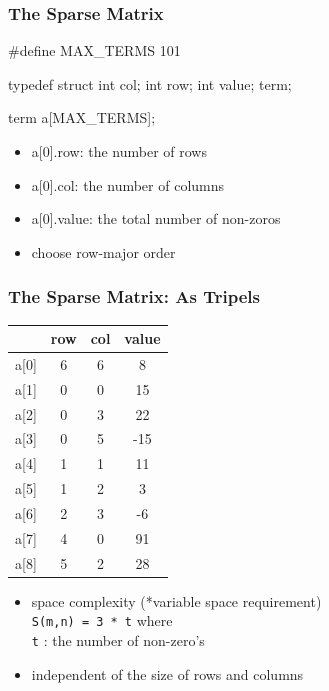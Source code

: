 \documentclass[newPxFont,sthlmFooter,nooffset]{beamer}
\begin{document}
\begin{frame}[t, fragile]
  \frametitle{The Sparse Matrix}
\begin{codedef}
#define MAX_TERMS 101 

typedef struct {
    int col; 
    int row; 
    int value;
} term;

term a[MAX_TERMS];  
\end{codedef}
\begin{itemize}
\item a[0].row: the number of rows
\item a[0].col: the number of columns
\item a[0].value: the total number of non-zoros
\item choose row-major order
\end{itemize}
\end{frame}

\begin{frame}[t, fragile]
  \frametitle{The Sparse Matrix: As Tripels}
  \begin{center}
    \begin{tabular}{r c c c}
      & row & col & value \\ \hline
      a[0]&  6  &  6  &   8   \\
      a[1]&  0  &  0  &  15   \\ 
      a[2]&  0  &  3  &  22   \\ 
      a[3]&  0  &  5  & -15   \\ 
      a[4]&  1  &  1  &  11   \\ 
      a[5]&  1  &  2  &   3   \\ 
      a[6]&  2  &  3  &  -6   \\ 
      a[7]&  4  &  0  &  91   \\ 
      a[8]&  5  &  2  &  28   \\ 
    \end{tabular}
  \end{center}
  \begin{itemize}
  \item space complexity (*variable space requirement) \\
\texttt{S(m,n) = 3 * t} where \\
\texttt{t} : the number of non-zero’s
\item independent of the size of rows and columns
  \end{itemize}

\end{frame}
\end{document}
